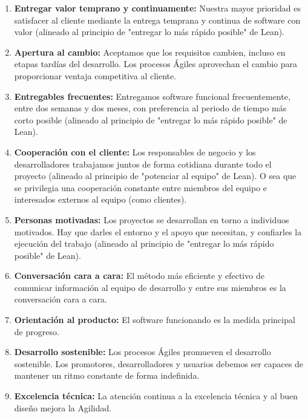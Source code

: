 \begin{enumerate}

\item \textbf{Entregar valor temprano y continuamente:} Nuestra mayor prioridad es satisfacer al cliente mediante la entrega temprana y continua de software con valor (alineado al principio de "entregar lo más rápido posible" de Lean).

\item \textbf{Apertura al cambio:} Aceptamos que los requisitos cambien, incluso en etapas tardías del desarrollo. Los procesos Ágiles aprovechan el cambio para proporcionar ventaja competitiva al cliente.

\item \textbf{Entregables frecuentes:} Entregamos software funcional frecuentemente, entre dos semanas y dos meses, con preferencia al periodo de tiempo más corto posible (alineado al principio de "entregar lo más rápido posible" de Lean).

\item \textbf{Cooperación con el cliente:} Los responsables de negocio y los desarrolladores trabajamos juntos de forma cotidiana durante todo el proyecto (alineado al principio de "potenciar al equipo" de Lean). O sea que se privilegia una cooperación constante entre miembros del equipo e interesados externos al equipo (como clientes).

\item \textbf{Personas motivadas:} Los proyectos se desarrollan en torno a individuos motivados. Hay que darles el entorno y el apoyo que necesitan, y confiarles la ejecución del trabajo (alineado al principio de "entregar lo más rápido posible" de Lean).

\item \textbf{Conversación cara a cara:} El método más eficiente y efectivo de comunicar información al equipo de desarrollo y entre sus miembros es la conversación cara a cara.

\item \textbf{Orientación al producto:} El software funcionando es la medida principal de progreso.

\item \textbf{Desarrollo sostenible:} Los procesos Ágiles promueven el desarrollo sostenible. Los promotores, desarrolladores y usuarios debemos ser capaces de mantener un ritmo constante de forma indefinida.

\item \textbf{Excelencia técnica:} La atención continua a la excelencia técnica y al buen diseño mejora la Agilidad.


\end{enumerate}
